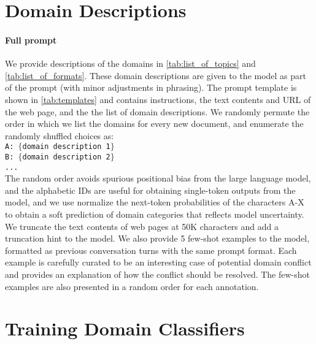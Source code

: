 \appendix
\onecolumn

\section{Domain Descriptions} \label{app:domain_descriptions}

\FloatBarrier


\FloatBarrier

\paragraph{Full prompt}
We provide descriptions of the domains in \autoref{tab:list_of_topics} and \autoref{tab:list_of_formats}.
These domain descriptions are given to the model as part of the prompt (with minor adjustments in phrasing).
The prompt template is shown in \autoref{tab:templates} and contains instructions, the text contents and URL of the web page, and the the list of domain descriptions.
We randomly permute the order in which we list the domains for every new document, and enumerate the randomly shuffled choices as: \texttt{ \\
\phantom{------}A: $\{$domain description 1$\}$ \\
\phantom{------}B: $\{$domain description 2$\}$ \\
\phantom{------}... \\
}
The random order avoids spurious positional bias from the large language model, and the alphabetic IDs are useful for obtaining single-token outputs from the model, and we use normalize the next-token probabilities of the characters A-X to obtain a soft prediction of domain categories that reflects model uncertainty. We truncate the text contents of web pages at 50K characters and add a truncation hint to the model.
We also provide 5 few-shot examples to the model, formatted as previous conversation turns with the same prompt format. Each example is carefully curated to be an interesting case of potential domain conflict and provides an explanation of how the conflict should be resolved. The few-shot examples are also presented in a random order for each annotation.


\FloatBarrier

\section{Training Domain Classifiers} \label{app:domain_classifiers}

